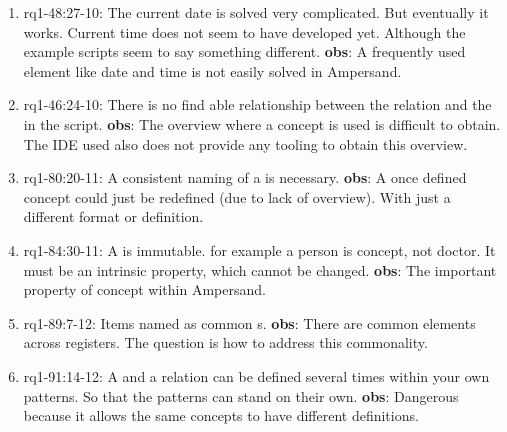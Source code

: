 \begin{enumerate}
    \item rq1-48:27-10: The  current date is solved very complicated.
    But eventually it works.
    Current time does not seem to have developed yet.
    Although the example scripts seem to say something different.
    \newline\textbf{obs}: A frequently used element like date and time is not easily solved in Ampersand.
    
    \item rq1-46:24-10: There is no find able relationship between the {relation} and the  in the script.
    \newline\textbf{obs}: The {overview} where a concept is used is difficult to obtain.
    The IDE used also does not provide any tooling to obtain this overview.

    \item rq1-80:20-11: A consistent naming of a  is necessary.
    \newline\textbf{obs}: A once defined concept could just be redefined (due to lack of overview).
    With just a different format or definition.
    
    \item rq1-84:30-11: A  is immutable.
    for example a person is concept, not doctor.
    It must be an intrinsic property, which cannot be changed.
    \newline\textbf{obs}: The important property of concept within Ampersand.
    
    \item rq1-89:7-12: Items named as common s.
    \newline\textbf{obs}: There are common elements across registers. The question is how to address this commonality.
    
    \item rq1-91:14-12: A  and a {relation} can be defined several times within your own patterns.
    So that the patterns can stand on their own.
    \newline\textbf{obs}: Dangerous because it allows the same concepts to have different definitions.
\end{enumerate}

